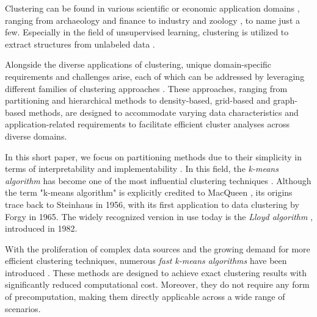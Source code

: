 Clustering can be found in various scientific or economic application domains \cite{ezugwu2022comprehensive,oyewole2023data, gan2020data}, ranging from archaeology \cite{troiano2024comparative} and finance \cite{cai2016clustering} to industry \cite{lee2021technological} and zoology \cite{shen2021multivariate}, to name just a few. Especially in the field of unsupervised learning, clustering is utilized to extract structures from unlabeled data \cite{chander2023data}.

Alongside the diverse applications of clustering, unique domain-specific requirements and challenges arise, each of which can be addressed by leveraging different families of clustering approaches \cite{xu2015comprehensive,han2012data}. These approaches, ranging from partitioning and hierarchical methods to density-based, grid-based and graph-based methods, are designed to accommodate varying data characteristics and application-related requirements to facilitate efficient cluster analyses across diverse domains.


In this short paper, we focus on partitioning methods due to their simplicity in terms of interpretability and implementability \cite{DBLP:conf/iiwas/BeecksBHLSD22}. In this field, the \emph{k-means algorithm} \cite{bock2007clustering,hans2008origins,DBLP:journals/prl/Jain10,steinley2006k} has become one of the most influential clustering techniques \cite{DBLP:journals/kais/WuKQGYMMNLYZSHS08,olukanmi2019rethinking}. Although the term "k-means algorithm" is explicitly credited to MacQueen \cite{macqueen1967}, its origins trace back to Steinhaus \cite{steinhaus1956division} in 1956, with its first application to data clustering by Forgy \cite{forgy1965cluster} in 1965. The widely recognized version in use today is the \emph{Lloyd algorithm} \cite{DBLP:journals/tit/Lloyd82}, introduced in 1982.

With the proliferation of complex data sources and the growing demand for more efficient clustering techniques, numerous \emph{fast k-means algorithms} have been introduced \cite{DBLP:conf/icml/Elkan03,DBLP:conf/sdm/Hamerly10,drake2012accelerated,hamerly2015accelerating,DBLP:conf/icml/NewlingF16,DBLP:conf/icml/DingZSMM15}. These methods are designed to achieve exact clustering results with significantly reduced computational cost. Moreover, they do not require any form of precomputation, making them directly applicable across a wide range of scenarios.

